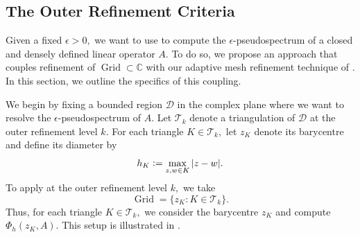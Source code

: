 





\subsection{The Outer Refinement Criteria}

Given a fixed $\epsilon > 0,$ we want to use  to compute the $\epsilon$-pseudospectrum of a closed and densely defined linear operator $A.$ To do so, we propose an approach that couples refinement of $\operatorname{Grid} \subset \mathbb{C}$ with our adaptive mesh refinement technique of . In this section, we outline the specifics of this coupling.

We begin by fixing a bounded region $\mathcal{D}$ in the complex plane where we want to resolve the $\epsilon$-pseudospectrum of $A.$ Let $\mathcal{T}_k$ denote a triangulation of $\mathcal{D}$ at the outer refinement level $k.$ For each triangle $K \in \mathcal{T}_k,$
let $z_K$ denote its barycentre and define its diameter by
\begin{equation} \label{diam}
    h_K \vcentcolon= \max_{z, w \in K} |z-w|.
\end{equation}
 To apply  at the outer refinement level $k,$ we take 
\begin{equation} \label{Grid}
    \operatorname{Grid} = \{ z_K : K \in \mathcal{T}_k \}.
\end{equation}
Thus, for each triangle $ K \in \mathcal{T}_k,$ we consider the barycentre $z_K$ and compute $\Phi_h(z_K, A).$ This setup is illustrated in . 



